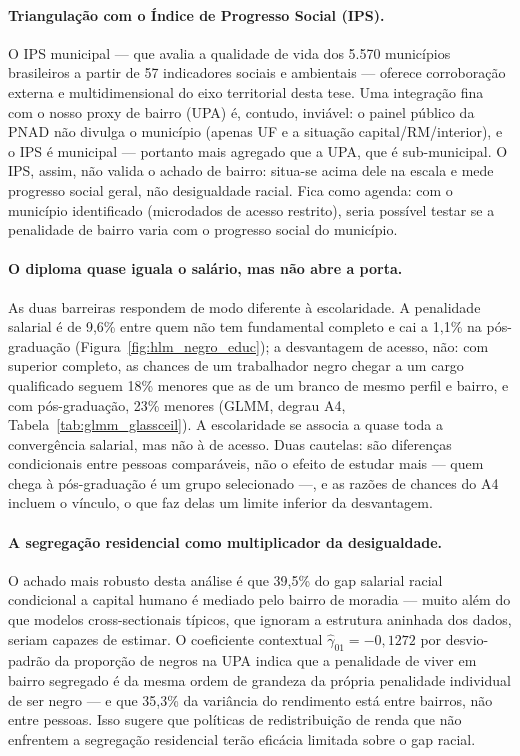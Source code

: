 \documentclass[11pt, a4paper, oneside]{article}
\begin{document}
\paragraph{Triangulação com o Índice de Progresso Social (IPS).}
O IPS municipal \cite{wilm2026} --- que avalia a qualidade de vida dos
5.570 municípios brasileiros a partir de 57 indicadores sociais e ambientais ---
oferece corroboração externa e multidimensional do eixo territorial desta tese.
Uma integração {fina} com o nosso proxy de bairro (UPA) é, contudo,
inviável: o painel público da PNAD não divulga o município (apenas UF e a situação
capital/RM/interior), e o IPS é municipal --- portanto mais agregado que a UPA, que
é sub-municipal. O IPS, assim, não valida o achado de {bairro}: situa-se
acima dele na escala e mede progresso social geral, não desigualdade racial. Fica
como agenda: com o município identificado (microdados de acesso restrito), seria
possível testar se a penalidade de bairro varia com o progresso social do município.


\paragraph{O diploma quase iguala o salário, mas não abre a porta.}
As duas barreiras respondem de modo diferente à escolaridade. A penalidade salarial é de 9{,}6\% entre quem não tem fundamental completo e cai a 1{,}1\% na pós-graduação (Figura~\ref{fig:hlm_negro_educ}); a desvantagem de acesso, não: com superior completo, as chances de um trabalhador negro chegar a um cargo qualificado seguem 18\% menores que as de um branco de mesmo perfil e bairro, e com pós-graduação, 23\% menores (GLMM, degrau A4, Tabela~\ref{tab:glmm_glassceil}). A escolaridade se associa a quase toda a convergência salarial, mas não à de acesso. Duas cautelas: são diferenças condicionais entre pessoas comparáveis, não o efeito de estudar mais --- quem chega à pós-graduação é um grupo selecionado ---, e as razões de chances do A4 incluem o vínculo, o que faz delas um limite inferior da desvantagem.

\paragraph{A segregação residencial como multiplicador da desigualdade.}
O achado mais robusto desta análise é que 39,5\% do gap salarial racial
condicional a capital humano é mediado pelo bairro de moradia --- muito além do que modelos
cross-sectionais típicos, que ignoram a estrutura aninhada dos dados,
seriam capazes de estimar. O coeficiente contextual
$\hat{\gamma}_{01} = −0,1272$ por desvio-padrão da proporção de negros na UPA
indica que a penalidade de viver em bairro segregado é da mesma ordem
de grandeza da própria penalidade individual de ser negro --- e que 35,3\%
da variância do rendimento está entre bairros, não entre pessoas.
Isso sugere que políticas de redistribuição de renda que não enfrentem
a segregação residencial terão eficácia limitada sobre o gap racial.
\end{document}
